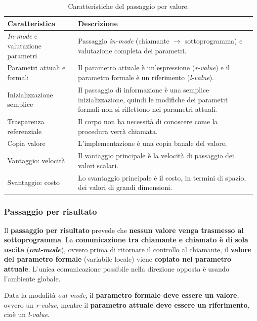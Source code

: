 \documentclass[a4paper]{article}
\begin{document}
	\begin{table}[!htbp]
		\centering
		\begin{tabular}{@{} l p{19em} @{}}
			\toprule
			Caratteristica & Descrizione \\
			\midrule
			\emph{In-mode} e valutazione parametri & Passaggio \emph{in-mode} (chiamante $\rightarrow$ sottoprogramma) e valutazione completa dei parametri. \\ [0.5em]
			Parametri attuali e formali & Il parametro attuale è un'espressione (\emph{r-value}) e il parametro formale è un riferimento (\emph{l-value}). \\ [0.5em]
			Inizializzazione semplice	& Il passaggio di informazione è una semplice inizializzazione, quindi le modifiche dei parametri formali non si riflettono nei parametri attuali. \\ [0.5em]
			Trasparenza referenziale	& Il corpo non ha necessità di conoscere come la procedura verrà chiamata. \\ [0.5em]
			Copia valore				& L'implementazione è una copia banale del valore. \\ [0.5em]
			Vantaggio: velocità			& Il vantaggio principale è la velocità di passaggio dei valori scalari. \\ [0.5em]
			Svantaggio: costo			& Lo svantaggio principale è il costo, in termini di spazio, dei valori di grandi dimensioni. \\
			\bottomrule
		\end{tabular}
		\caption{Caratteristiche del passaggio per valore.}
	\end{table}\newpage
	
	\subsubsection{Passaggio per risultato}\label{passaggio per risultato}
	
	Il \textcolor{Red3}{\textbf{passaggio per risultato}} prevede che \textbf{nessun valore venga trasmesso al sottoprogramma}. La \textbf{comunicazione tra chiamante e chiamato è di sola uscita} (\emph{\textbf{out-mode}}), ovvero prima di ritornare il controllo al chiamante, il \textbf{valore del parametro formale} (variabile locale) viene \textbf{copiato nel parametro attuale}. L'unica comunicazione possibile nella direzione opposta è usando l'ambiente globale.\newline
	
	\noindent
	Data la modalità \emph{out-mode}, il \textbf{parametro formale deve essere un valore}, ovvero un \emph{r-value}, mentre il \textbf{parametro attuale deve essere un riferimento}, cioè un \emph{l-value}.\newline
	
\end{document}
